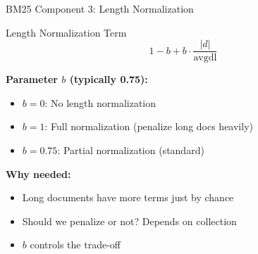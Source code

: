 \documentclass[aspectratio=169]{beamer}
\newif\ifanimated
\newcommand{\cpause}{\ifanimated\pause\fi}
\begin{document}
\begin{frame}[shrink=5]{BM25 Component 3: Length Normalization}
\begin{block}{Length Normalization Term}
$$1 - b + b \cdot \frac{|d|}{\text{avgdl}}$$
\end{block}

\textbf{Parameter $b$ (typically 0.75):}
\begin{itemize}
    \item $b = 0$: No length normalization
    \item $b = 1$: Full normalization (penalize long docs heavily)
    \item $b = 0.75$: Partial normalization (standard)
\end{itemize}\cpause

\vspace{1em}

\textbf{Why needed:}
\begin{itemize}
    \item Long documents have more terms just by chance
    \item Should we penalize or not? Depends on collection
    \item $b$ controls the trade-off
\end{itemize}\cpause
\end{frame}


\end{document}
